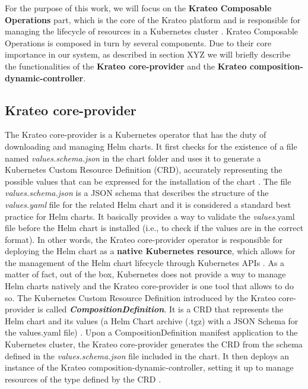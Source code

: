 For the purpose of this work, we will focus on the \textbf{Krateo Composable Operations} part, which is the core of the Krateo platform and is responsible for managing the lifecycle of resources in a Kubernetes cluster \cite{krateo_docs}.
Krateo Composable Operations is composed in turn by several components. Due to their core importance in our system, as described in section XYZ we will briefly describe the functionalities of the \textbf{Krateo core-provider} and the \textbf{Krateo composition-dynamic-controller}.

\subsection{Krateo core-provider}

The Krateo core-provider is a Kubernetes operator that has the duty of downloading and managing Helm charts. It first checks for the existence of a file named \textit{values.schema.json} in the chart folder and uses it to generate a Kubernetes Custom Resource Definition (CRD), accurately representing the possible values that can be expressed for the installation of the chart \cite{krateo_core_provider}.
The file \textit{values.schema.json} is a JSON schema that describes the structure of the \textit{values.yaml} file for the related Helm chart and it is considered a standard best practice for Helm charts. It basically provides a way to validate the \textit{values}.yaml file before the Helm chart is installed (i.e., to check if the values are in the correct format).
In other words, the Krateo core-provider operator is responsible for deploying the Helm chart as a \textbf{native Kubernetes resource}, which allows for the management of the Helm chart lifecycle through Kubernetes APIs \cite{krateo_docs}.
As a matter of fact, out of the box, Kubernetes does not provide a way to manage Helm charts natively and the Krateo core-provider is one tool that allows to do so.
The Kubernetes Custom Resource Definition introduced by the Krateo core-provider is called \textbf{\textit{CompositionDefinition}}. It is a CRD that represents the Helm chart and its values (a Helm Chart archive (.tgz) with a JSON Schema for the values.yaml file) \cite{krateo_core_provider}.
Upon a CompositionDefinition manifest application to the Kubernetes cluster, the Krateo core-provider generates the CRD from the schema defined in the \textit{values.schema.json} file included in the chart. It then deploys an instance of the Krateo composition-dynamic-controller, setting it up to manage resources of the type defined by the CRD \cite{krateo_core_provider}.

